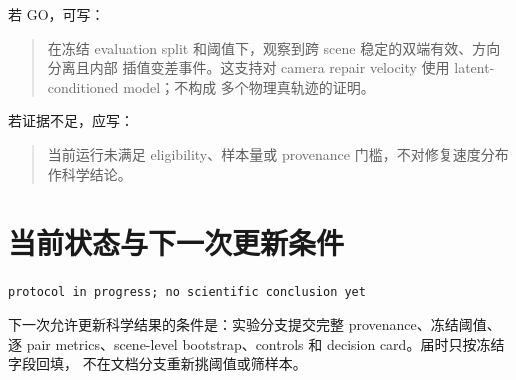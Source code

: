 \documentclass[UTF8,a4paper,11pt]{ctexart}
\begin{document}
若 GO，可写：
\begin{quote}
在冻结 evaluation split 和阈值下，观察到跨 scene 稳定的双端有效、方向分离且内部
插值变差事件。这支持对 camera repair velocity 使用 latent-conditioned model；不构成
多个物理真轨迹的证明。
\end{quote}

若证据不足，应写：
\begin{quote}
当前运行未满足 eligibility、样本量或 provenance 门槛，不对修复速度分布作科学结论。
\end{quote}

\section{当前状态与下一次更新条件}

\begin{warningbox}
\texttt{protocol in progress; no scientific conclusion yet}
\end{warningbox}

下一次允许更新科学结果的条件是：实验分支提交完整 provenance、冻结阈值、逐 pair
metrics、scene-level bootstrap、controls 和 decision card。届时只按冻结字段回填，
不在文档分支重新挑阈值或筛样本。



\end{document}
